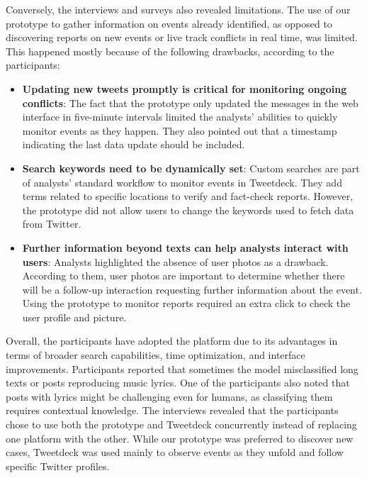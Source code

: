 \documentclass[11pt,letterpaper]{article}
\begin{document}
Conversely, the interviews and surveys also revealed limitations. The use of our prototype to gather information on events already identified, as opposed to discovering reports on new events or live track conflicts in real time, was limited. This happened mostly because of the following drawbacks, according to the participants:

\begin{itemize}
    \item \textbf{Updating new tweets promptly is critical for monitoring ongoing conflicts}: The fact that the prototype only updated the messages in the web interface in five-minute intervals limited the analysts' abilities to quickly monitor events as they happen. They also pointed out that a timestamp indicating the last data update should be included.

    \item \textbf{Search keywords need to be dynamically set}: Custom searches are part of analysts' standard workflow to monitor events in Tweetdeck. They add terms related to specific locations to verify and fact-check reports. However, the prototype did not allow users to change the keywords used to fetch data from Twitter. 

    \item \textbf{Further information beyond texts can help analysts interact with users}: Analysts highlighted the absence of user photos as a drawback. According to them, user photos are important to determine whether there will be a follow-up interaction requesting further information about the event. Using the prototype to monitor reports required an extra click to check the user profile and picture.

\end{itemize}

Overall, the participants have adopted the platform due to its advantages in terms of broader search capabilities, time optimization, and interface improvements. Participants reported that sometimes the model misclassified long texts or posts reproducing music lyrics. One of the participants also noted that posts with lyrics might be challenging even for humans, as classifying them requires contextual knowledge. The interviews revealed that the participants chose to use both the prototype and Tweetdeck concurrently instead of replacing one platform with the other. While our prototype was preferred to discover new cases, Tweetdeck was used mainly to observe events as they unfold and follow specific Twitter profiles.
\end{document}
